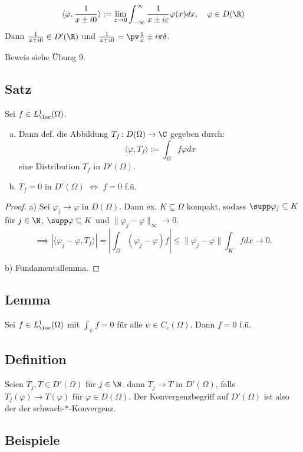 $$\langle \varphi, \frac{1}{x \pm i0} \rangle := \lim_{\varepsilon \to 0} \int_{-\infty}^\infty \frac{1}{x \pm i\varepsilon} \varphi(x) dx, \quad \varphi \in D(\R)$$
Dann $\frac{1}{x \pm i0} \in D'(\R)$ und $\frac{1}{x \pm i0} = \pv \frac{1}{x} \pm i\pi\delta$.

Beweis siehe Übung 9.

\subsection{Satz}

Sei $f \in L^1_{\loc}(\Omega)$.
\begin{enumerate}[a)]
  \item Dann def. die Abbildung $T_f \colon D(\Omega) \to \C$ gegeben durch:
    $$ \langle \varphi, T_f\rangle := \int_\Omega f\varphi dx $$
    eine Distribution $T_f$ in $D'(\Omega)$.
  \item $T_f = 0$ in $D'(\Omega)$ $\iff$ $f = 0$ f.ü.
\end{enumerate}

\begin{proof}
a) Sei $\varphi_j \to \varphi$ in $D(\Omega)$.
Dann ex. $K \subseteq \Omega$ kompakt, sodass $\supp \varphi_j \subseteq K$ für $j \in \N$, $\supp \varphi \subseteq K$ und $\|\varphi_j - \varphi\|_\infty \to 0$.
$$\implies |\langle \varphi_j - \varphi, T_f \rangle| = |\int_\Omega (\varphi_j - \varphi)f| \leq \| \varphi_j - \varphi\| \int_K f dx \to 0.$$

b) Fundamentallemma.
\end{proof}

\subsection{Lemma}
Sei $f \in L^1_{\loc}(\Omega)$ mit $\int_\psi f = 0$ für alle $\psi \in C_c(\Omega)$.
Dann $f = 0$ f.ü.

\subsection{Definition}

Seien $T_j, T \in D'(\Omega)$ für $j \in \N$. 
dann $T_j \to T$ in $D'(\Omega)$, falls $T_j(\varphi) \to T(\varphi)$ für $\varphi \in D(\Omega)$.
Der Konvergenzbegriff auf $D'(\Omega)$ ist also der der schwach-*-Konvergenz.

\subsection{Beispiele}

